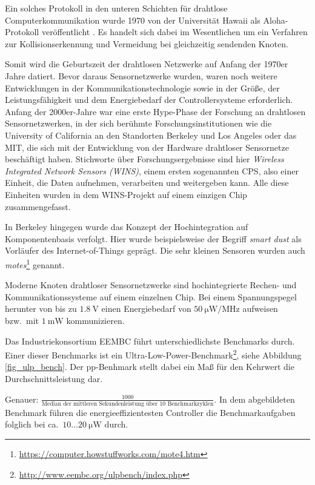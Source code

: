 Ein solches Protokoll in den unteren Schichten für drahtlose Computerkommunikation wurde 1970 von der Universität Hawaii als Aloha-Protokoll veröffentlicht \parencite{Abramson1970, Schwartz2009}. Es handelt sich dabei im Wesentlichen um ein Verfahren zur Kollisionserkennung und Vermeidung bei gleichzeitig sendenden Knoten.

Somit wird die Geburtszeit der drahtlosen Netzwerke auf Anfang der 1970er Jahre datiert. Bevor daraus Sensornetzwerke wurden, waren noch weitere Entwicklungen in der Kommunikationstechnologie sowie in der Größe, der Leistungsfähigkeit und dem Energiebedarf der Controllersysteme erforderlich. Anfang der 2000er-Jahre war eine erste Hype-Phase der Forschung an drahtlosen Sensornetzwerken, in der sich berühmte Forschungsinstitutionen wie die University of California an den Standorten Berkeley und Los Angeles oder das MIT, die sich mit der Entwicklung von der Hardware drahtloser Sensornetze beschäftigt haben. Stichworte über Forschungsergebnisse sind hier \emph{Wireless Integrated Network Sensors (WINS)}, einem ersten sogenannten \ac{CPS}, also einer Einheit, die Daten aufnehmen, verarbeiten und weitergeben kann. Alle diese Einheiten wurden in dem WINS-Projekt auf einem einzigen Chip zusammengefasst.

In Berkeley hingegen wurde das Konzept der Hochintegration auf Komponentenbasis verfolgt. Hier wurde beispielsweise der Begriff \emph{smart dust} \parencite{Kahn1999} als Vorläufer des Internet-of-Things geprägt. Die sehr kleinen Sensoren wurden auch \emph{motes}\footnote{\url{https://computer.howstuffworks.com/mote4.htm}} genannt.

Moderne Knoten drahtloser Sensornetzwerke sind hochintegrierte Rechen- und Kommunikationssysteme auf einem einzelnen Chip. Bei einem Spannungspegel herunter von bis zu $\SI{1.8}{\volt}$ einen Energiebedarf von $\SI{50}{\micro\watt\per\mega\hertz}$ aufweisen bzw.~mit $\SI{1}{\milli\watt}$ kommunizieren.

Das Industriekonsortium EEMBC führt unterschiedlichste Benchmarks durch. Einer dieser Benchmarks ist ein Ultra-Low-Power-Benchmark\footnote{\url{http://www.eembc.org/ulpbench/index.php}}, siehe Abbildung \ref{fig_ulp_bench}. Der pp-Benhmark stellt dabei ein Maß für den Kehrwert die Durchschnittsleistung dar.

Genauer: $\frac{1000}{\text{Median der mittleren Sekundenleistung über 10 Benchmarkzyklen}}$. In dem abgebildeten Benchmark führen die energieeffizientesten Controller die Benchmarkaufgaben folglich bei ca.~$10\ldots \SI{20}{\micro\watt}$ durch.

